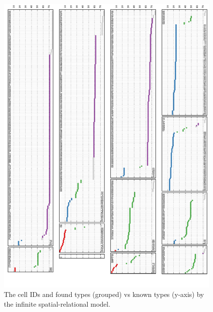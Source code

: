 \documentclass{article}
\begin{document}
\begin{figure}[h!]

  \centering 
    \centerline{\includegraphics[width=6.0in]{mouseretina/retina.1.2.ld.0.0.data-fixed_20_100-anneal_slow_400.truth_latent.pdf}}
  \caption{The cell IDs and found types (grouped) vs known types (y-axis) by the infinite spatial-relational model.}
\label{fig:supp:retinaldclusters}
\end{figure}
\end{document}
